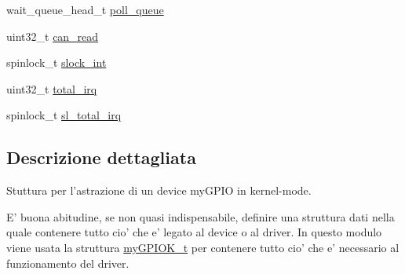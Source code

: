 \begin{DoxyCompactItemize}
\item 
wait\+\_\+queue\+\_\+head\+\_\+t \hyperlink{structmy_g_p_i_o_k__t_a2080617f88cafd765430573afe7701d1}{poll\+\_\+queue}
\item 
uint32\+\_\+t \hyperlink{structmy_g_p_i_o_k__t_a2b8d3d6037e2d2fdadbd7c2fd995f0a1}{can\+\_\+read}
\item 
spinlock\+\_\+t \hyperlink{structmy_g_p_i_o_k__t_a1e1ddf972b4dc84dd331a0c72e5d9895}{slock\+\_\+int}
\item 
uint32\+\_\+t \hyperlink{structmy_g_p_i_o_k__t_a2da711ac290a9613b8d8af97f122b997}{total\+\_\+irq}
\item 
spinlock\+\_\+t \hyperlink{structmy_g_p_i_o_k__t_ac41bbc7fe03ef25b7f468275fb565d78}{sl\+\_\+total\+\_\+irq}
\end{DoxyCompactItemize}


\subsection{Descrizione dettagliata}
Stuttura per l'astrazione di un device my\+G\+P\+I\+O in kernel-\/mode. 

E' buona abitudine, se non quasi indispensabile, definire una struttura dati nella quale contenere tutto cio' che e' legato al device o al driver. In questo modulo viene usata la struttura \hyperlink{structmy_g_p_i_o_k__t}{my\+G\+P\+I\+O\+K\+\_\+t} per contenere tutto cio' che e' necessario al funzionamento del driver. 

